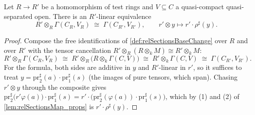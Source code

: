 \begin{theorem}
  \label{thm:relTermBaseChange}
  \leanok
  Let \(R \to R'\) be a homomorphism of test rings and \(V \subseteq C\) a quasi-compact
  quasi-separated open. There is an \(R'\)-linear equivalence
  \[
    R' \otimes_R \Gamma(C_R, V_R) \;\cong\; \Gamma(C_{R'}, V_{R'}), \qquad
    r' \otimes y \longmapsto r' \cdot \rho^{\sharp}(y) .
  \]
\end{theorem}
\begin{proof}
  \leanok
  Compose the free identifications of \ref{def:relSectionsBaseChange} over \(R\) and
  over \(R'\) with the tensor cancellation
  \(R' \otimes_R (R \otimes_k M) \cong R' \otimes_k M\):
  \[
    R' \otimes_R \Gamma(C_R, V_R) \;\cong\; R' \otimes_R \bigl(R \otimes_k \Gamma(C, V)\bigr)
      \;\cong\; R' \otimes_k \Gamma(C, V) \;\cong\; \Gamma(C_{R'}, V_{R'}) .
  \]
  For the formula, both sides are additive in \(y\) and \(R'\)-linear in \(r'\), so it
  suffices to treat \(y = \mathrm{pr}_2^{\sharp}(a) \cdot \mathrm{pr}_1^{\sharp}(s)\)
  (the images of pure tensors, which span). Chasing \(r' \otimes y\) through the
  composite gives \(\mathrm{pr}_2^{\sharp}\bigl(r' \varphi(a)\bigr) \cdot
  \mathrm{pr}_1^{\sharp}(s) = r' \cdot \bigl(\mathrm{pr}_2^{\sharp}(\varphi(a)) \cdot
  \mathrm{pr}_1^{\sharp}(s)\bigr)\), which by (1) and (2) of
  \ref{lem:relSectionsMap_props} is \(r' \cdot \rho^{\sharp}(y)\).
\end{proof}

